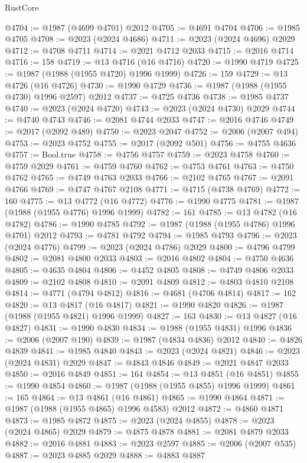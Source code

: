\begin{lexlean}{RustCore}
\begin{coremodule}
@4704 := @1987 (@4699 @4701) @2012
@4705 := @4691 @4704
@4706 := @1985 @4705
@4708 := @2023 (@2024 @4686)
@4711 := @2023 (@2024 @4696) @2029
@4712 := @4708 @4711
@4714 := @2021 @4712 @2033
@4715 := @2016 @4714
@4716 := 158
@4719 := @13 @4716 (@16 @4716)
@4720 := @1990 @4719
@4725 := @1987 (@1988 (@1955 @4720) @1996 @1999)
@4726 := 159
@4729 := @13 @4726 (@16 @4726)
@4730 := @1990 @4729
@4736 := @1987 (@1988 (@1955 @4730) @1996 @2597) @2012
@4737 := @4725 @4736
@4738 := @1985 @4737
@4740 := @2023 (@2024 @4720)
@4743 := @2023 (@2024 @4730) @2029
@4744 := @4740 @4743
@4746 := @2081 @4744 @2033
@4747 := @2016 @4746
@4749 := @2017 (@2092 @489)
@4750 := @2023 @2047
@4752 := @2006 (@2007 @494)
@4753 := @2023 @4752
@4755 := @2017 (@2092 @501)
@4756 := @4755 @4636
@4757 := Bool.true
@4758 := @4756 @4757
@4759 := @2023 @4758
@4760 := @4759 @2029
@4761 := @4759 @4760
@4762 := @4753 @4761
@4763 := @4750 @4762
@4765 := @4749 @4763 @2033
@4766 := @2102 @4765
@4767 := @2091 @4766
@4769 := @4747 @4767 @2108
@4771 := @4715 (@4738 @4769)
@4772 := 160
@4775 := @13 @4772 (@16 @4772)
@4776 := @1990 @4775
@4781 := @1987 (@1988 (@1955 @4776) @1996 @1999)
@4782 := 161
@4785 := @13 @4782 (@16 @4782)
@4786 := @1990 @4785
@4792 := @1987 (@1988 (@1955 @4786) @1996 @4701) @2012
@4793 := @4781 @4792
@4794 := @1985 @4793
@4796 := @2023 (@2024 @4776)
@4799 := @2023 (@2024 @4786) @2029
@4800 := @4796 @4799
@4802 := @2081 @4800 @2033
@4803 := @2016 @4802
@4804 := @4750 @4636
@4805 := @4635 @4804
@4806 := @4452 @4805
@4808 := @4749 @4806 @2033
@4809 := @2102 @4808
@4810 := @2091 @4809
@4812 := @4803 @4810 @2108
@4814 := @4771 (@4794 @4812)
@4816 := @4681 (@4706 @4814)
@4817 := 162
@4820 := @13 @4817 (@16 @4817)
@4821 := @1990 @4820
@4826 := @1987 (@1988 (@1955 @4821) @1996 @1999)
@4827 := 163
@4830 := @13 @4827 (@16 @4827)
@4831 := @1990 @4830
@4834 := @1988 (@1955 @4831) @1996
@4836 := @2006 (@2007 @190)
@4839 := @1987 (@4834 @4836) @2012
@4840 := @4826 @4839
@4841 := @1985 @4840
@4843 := @2023 (@2024 @4821)
@4846 := @2023 (@2024 @4831) @2029
@4847 := @4843 @4846
@4849 := @2021 @4847 @2033
@4850 := @2016 @4849
@4851 := 164
@4854 := @13 @4851 (@16 @4851)
@4855 := @1990 @4854
@4860 := @1987 (@1988 (@1955 @4855) @1996 @1999)
@4861 := 165
@4864 := @13 @4861 (@16 @4861)
@4865 := @1990 @4864
@4871 := @1987 (@1988 (@1955 @4865) @1996 @4583) @2012
@4872 := @4860 @4871
@4873 := @1985 @4872
@4875 := @2023 (@2024 @4855)
@4878 := @2023 (@2024 @4865) @2029
@4879 := @4875 @4878
@4881 := @2081 @4879 @2033
@4882 := @2016 @4881
@4883 := @2023 @2597
@4885 := @2006 (@2007 @535)
@4887 := @2023 @4885 @2029
@4888 := @4883 @4887

\end{coremodule}
\end{lexlean}
